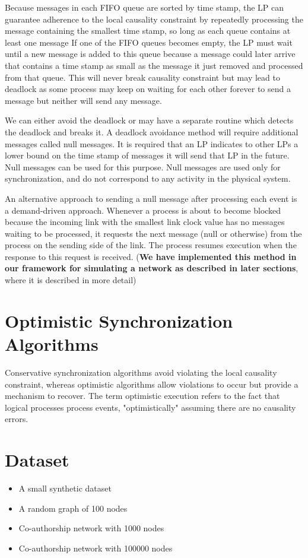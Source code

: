 \documentclass[12pt,a4paper]{article}
\begin{document}
	Because messages in each FIFO queue are sorted by time stamp, the LP can guarantee adherence to the local causality constraint by repeatedly processing the message containing the smallest time stamp, so long as each queue contains at least one message If one of the FIFO queues becomes empty, the LP must wait until a new message is added to this queue because a message could later arrive that contains a time stamp as small as the message it just removed and processed from that queue. This will never break causality constraint but may lead to deadlock as some process may keep on waiting for each other forever to send a message but neither will send any message.
	
	We can either avoid the deadlock or may have a separate routine which detects the deadlock and breaks it. A deadlock avoidance method will require additional messages called null messages. It is required that an LP indicates to other LPs a lower bound on the time stamp of messages it will send that LP in the future. Null messages can be used for this purpose. Null messages are used only for synchronization, and do not correspond to any activity in the physical system.
	
	An alternative approach to sending a null message after processing each event is a demand-driven approach. Whenever a process is about to become blocked because the incoming link with the smallest link clock value has no messages waiting to be processed, it requests the next message (null or otherwise) from the process on the sending side of the link. The process resumes execution when the response to this request is received. (\textbf{We have implemented this method in our framework for simulating a network as described in later sections}, where it is described in more detail)
	
	\section{Optimistic Synchronization Algorithms}
	
	Conservative synchronization algorithms avoid violating the local causality constraint, whereas optimistic algorithms allow violations to occur but provide a mechanism to recover. The term optimistic execution refers to the fact that logical processes process events, "optimistically" assuming there are no causality errors.
	
	
\section{Dataset}
	\begin{itemize}[nolistsep]
		\item A small synthetic dataset
		\item A random graph of 100 nodes
		\item Co-authorship network with 1000 nodes
		\item Co-authorship network with 100000 nodes
	\end{itemize}
\end{document}
